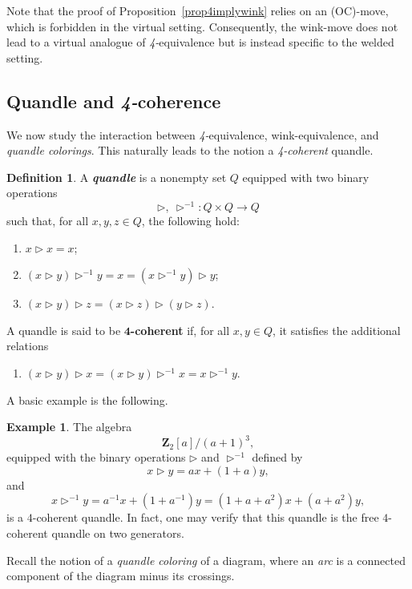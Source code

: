 \documentclass[11pt, a4paper, twoside,reqno]{amsart}
\theoremstyle{plain}
\theoremstyle{definition}
\newtheorem{defn}[thm]{Definition}
\newtheorem{ex}[thm]{Example}
\theoremstyle{remark}
\begin{document}
Note that the proof of Proposition~\ref{prop4implywink} relies on an (OC)-move, which is forbidden in the virtual setting. Consequently, the wink-move does not lead to a virtual analogue of \textit{4-}equivalence but is instead specific to the welded setting.

\subsection{Quandle and \textit{4-}coherence}

We now study the interaction between \textit{4-}equivalence, wink-equivalence, and \emph{quandle colorings}. This naturally leads to the notion a \emph{\textit{4-}coherent} quandle.
\begin{defn}\label{defquandle}
A \emph{\textbf{quandle}} is a nonempty set \(Q\) equipped with two binary operations
\[
\rhd,\ \rhd^{-1} : Q \times Q \to Q
\]
such that, for all \(x,y,z\in Q\), the following hold:
\begin{enumerate}
    \item \(x \rhd x = x\);
    
    \item \((x \rhd y)\rhd^{-1} y = x = (x \rhd^{-1} y)\rhd y\);
    
    \item \((x \rhd y)\rhd z = (x \rhd z)\rhd (y \rhd z)\).
\end{enumerate}

\noindent A quandle is said to be \(\mathbf{4}\)\textbf{-coherent} if, for all \(x,y\in Q\), it satisfies the additional relations
\begin{enumerate}
    \item[(4)] \((x \rhd y)\rhd x = (x \rhd y)\rhd^{-1} x = x \rhd^{-1} y\).
\end{enumerate}
\end{defn}

A basic example is the following.

\begin{ex}\label{exquandleFQ2}
The algebra
\[
\mathbf{Z}_2[a]\big/(a+1)^3,
\]
equipped with the binary operations \(\rhd\) and \(\rhd^{-1}\) defined by
\[
x \rhd y = ax + (1+a)y,
\]
and
\[
x \rhd^{-1} y
   = a^{-1}x + (1+a^{-1})y
   = (1+a+a^2)x + (a+a^2)y,
\]
is a \(4\)-coherent quandle. In fact, one may verify that this quandle is the free \(4\)-coherent quandle on two generators.
\end{ex}

Recall the notion of a \emph{quandle coloring} of a diagram, where an \emph{arc} is a connected component of the diagram minus its crossings.
\end{document}

